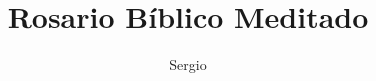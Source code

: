 \documentclass[11pt,a4paper]{report}
\title{Rosario Bíblico Meditado}
\author{Sergio}
\begin{document}
\begin{titlepage}
    \maketitle
\end{titlepage}
















\end{document}
